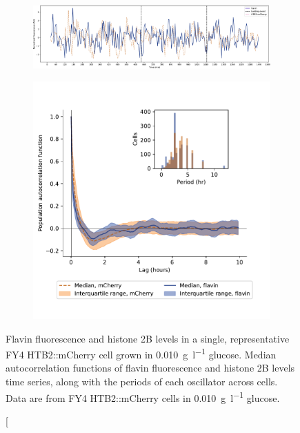 \begin{figure}
  \centering
  \begin{subfigure}[htpb]{1.0\textwidth}
   \centering
   \includegraphics[width=\textwidth]{limiting_single_birth_plot_edit.pdf}
   \caption{
   }
   \label{fig:biology-lowglc-single}
  \end{subfigure}

  \begin{subfigure}[htpb]{0.7\textwidth}
   \centering
   \includegraphics[width=\textwidth]{htb2mCherry_31492_12.pdf}
   \caption{
   }
   \label{fig:biology-lowglc-acf}
  \end{subfigure}
  \caption[
    Flavin fluorescence and histone 2B levels in a single, representative FY4 HTB2::mCherry cell grown in \SI{0.010}{\gram~\litre^{-1}} glucose.
    Median autocorrelation functions of flavin fluorescence and histone 2B levels time series, along with  the periods of each oscillator across cells.
    Data are from FY4 HTB2::mCherry cells in \SI{0.010}{\gram~\litre^{-1}} glucose.

\end{figure}
